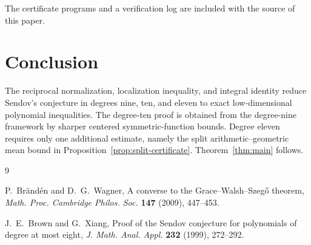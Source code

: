 \documentclass[11pt]{article}
\theoremstyle{remark}
\begin{document}
The certificate programs and a verification log are included with the source
of this paper.

\section{Conclusion}

The reciprocal normalization, localization inequality, and integral identity
reduce Sendov's conjecture in degrees nine, ten, and eleven to exact
low-dimensional polynomial inequalities.  The degree-ten proof is obtained
from the degree-nine framework by sharper centered symmetric-function bounds.
Degree eleven requires only one additional estimate, namely the split
arithmetic--geometric mean bound in
Proposition~\ref{prop:split-certificate}.  Theorem~\ref{thm:main} follows.

\begin{thebibliography}{9}

P.~Br\"and\'en and D.~G.~Wagner,
\newblock A converse to the Grace--Walsh--Szeg\H{o} theorem,
\newblock \emph{Math. Proc. Cambridge Philos. Soc.} \textbf{147} (2009),
447--453.

J.~E.~Brown and G.~Xiang,
\newblock Proof of the Sendov conjecture for polynomials of degree at most
 eight,
\newblock \emph{J. Math. Anal. Appl.} \textbf{232} (1999), 272--292.

\end{thebibliography}
\end{document}
